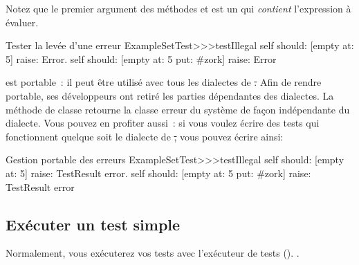 \documentclass[a4paper,10pt,twoside]{book}
\begin{document}

Notez que le premier argument des méthodes  et  est un  qui \emph{contient}
l'expression à évaluer.
 

\begin{method}[ESTtestIllegal]{Tester la levée d'une erreur}
ExampleSetTest>>>testIllegal
	self should: [empty at: 5] raise: Error.
	self should: [empty at: 5 put: #zork] raise: Error
\end{method}

\sunit est portable~: il peut être utilisé avec tous les dialectes de \st. Afin de rendre \sunit portable, ses développeurs ont retiré les parties dépendantes des dialectes. La méthode de classe  retourne la classe erreur du système de façon indépendante du dialecte. Vous pouvez en profiter aussi~: si vous voulez écrire des tests qui fonctionnent quelque soit le dialecte de \st, vous pouvez écrire  ainsi:


\begin{method}[portabletestillegal]{Gestion portable des erreurs}
ExampleSetTest>>>testIllegal
	self should: [empty at: 5] raise: TestResult error.
	self should: [empty at: 5 put: #zork] raise: TestResult error
\end{method}


\subsection{Exécuter un test simple}
Normalement, vous exécuterez vos tests avec l'exécuteur de tests
().
  . %
\end{document}
